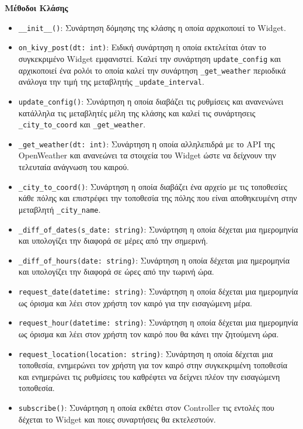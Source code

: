 \noindent\textbf{Μέθοδοι Κλάσης}
\begin{itemize}
	\item \texttt{\_\_init\_\_()}: Συνάρτηση δόμησης της κλάσης η οποία αρχικοποιεί το Widget.
	\item \texttt{on\_kivy\_post(dt: int)}: Ειδική συνάρτηση η οποία εκτελείται όταν το συγκεκριμένο Widget εμφανιστεί. Καλεί την συνάρτηση \texttt{update\_config} και αρχικοποιεί ένα ρολόι το οποία καλεί την συνάρτηση \texttt{\_get\_weather} περιοδικά ανάλογα την τιμή της μεταβλητής \texttt{\_update\_interval}.
	\item \texttt{update\_config()}: Συνάρτηση η οποία διαβάζει τις ρυθμίσεις και ανανενώνει κατάλληλα τις μεταβλητές μέλη της κλάσης και καλεί τις συνάρτησεις \texttt{\_city\_to\_coord} και \texttt{\_get\_weather}.
	\item \texttt{\_get\_weather(dt: int)}: Συνάρτηση η οποία αλληλεπιδρά με το API της OpenWeather και ανανεώνει τα στοιχεία του Widget ώστε να δείχνουν την τελευταία ανάγνωση του καιρού.
	\item \texttt{\_city\_to\_coord()}: Συνάρτηση η οποία διαβάζει ένα αρχείο με τις τοποθεσίες κάθε πόλης και επιστρέφει την τοποθεσία της πόλης που είναι αποθηκευμένη στην μεταβλητή \texttt{\_city\_name}.
	\item \texttt{\_diff\_of\_dates(s\_date: string)}: Συνάρτηση η οποία δέχεται μια ημερομηνία και υπολογίζει την διαφορά σε μέρες από την σημερινή.
	\item \texttt{\_diff\_of\_hours(date: string)}: Συνάρτηση η οποία δέχεται μια ημερομηνία και υπολογίζει την διαφορά σε ώρες από την τωρινή ώρα.
	\item \texttt{request\_date(datetime: string)}: Συνάρτηση η οποία δέχεται μια ημερομηνία ως όρισμα  και λέει στον χρήστη τον καιρό για την εισαγώμενη μέρα.
	\item \texttt{request\_hour(datetime: string)}: Συνάρτηση η οποία δέχεται μια ημερομηνία ως όρισμα  και λέει στον χρήστη τον καιρό που θα κάνει την ζητούμενη ώρα.
	\item \texttt{request\_location(location: string)}: Συνάρτηση η οποία δέχεται μια τοποθεσία, ενημερώνει τον χρήστη για τον καιρό στην συγκεκριμένη τοποθεσία και ενημερώνει τις ρυθμίσεις του καθρέφτει να δείχνει πλέον την εισαγώμενη τοποθεσία.
	\item \texttt{subscribe()}: Συνάρτηση η οποία εκθέτει στον Controller τις εντολές που δέχεται το Widget και ποιες συναρτήσεις θα εκτελεστούν.
\end{itemize}
